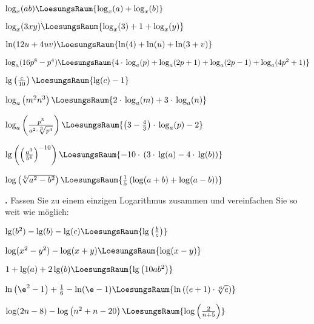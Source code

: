 \begin{bbwAufgabenBlock}
\item $\log_x(ab)  \LoesungsRaum{\log_x(a) + \log_x(b)}$
\item $\log_x(3xy)  \LoesungsRaum{\log_x(3) + 1 + \log_x(y)}$
\item $\ln(12u+4uv)  \LoesungsRaum{\ln(4) + \ln(u) + \ln(3+v)}$
\item $\log_a(16p^8-p^4) \LoesungsRaum{4\cdot{}\log_a(p)+ \log_a(2p+1) + \log_a(2p-1)+ \log_a(4p^2+1)}$
\seitenUmbruchImAufgabenteil{}
\item $\lg\left(\frac{c}{10}\right)  \LoesungsRaum{\lg(c) - 1}$
\item $\log_a\left( m^2n^3 \right)  \LoesungsRaum{2\cdot{}\log_a(m) + 3\cdot{}\log_a(n)}$
\item $\log_a\left( \frac{p^3}{a^2 \cdot{} \sqrt[3]{p^4}} \right)  \LoesungsRaum{\left(3-\frac43\right)\cdot{}\log_a(p)- 2}$
\item
$\lg\left(\left(\frac{a^3}{b^4}\right)^{-10}\right)  \LoesungsRaum{-10\cdot{}\left(3 \cdot{}\lg(a) - 4\cdot{} \lg(b)\right)}$
\noTRAINER{\newpage}

\item $\log \left( \sqrt[5]{a^2-b^2}\right)  \LoesungsRaum{\frac15\left(\log(a+b) + \log(a-b)\right)}$

\end{bbwAufgabenBlock}

\newpage


\textbf{\bbwAufgabenNummer{}.}
Fassen Sie zu einem einzigen Logarithmus zusammen und vereinfachen Sie
so weit wie möglich:

\begin{bbwAufgabenBlock}
\item $\lg(b^2) - \lg(b) - \lg(c) \LoesungsRaum{\lg\left(\frac{b}c\right)}$
\item $\log(x^2-y^2) - \log(x+y) \LoesungsRaum{\log(x-y)}$
\item $1+\lg(a)+2\lg(b)  \LoesungsRaum{\lg\left( 10ab^2 \right)}$
\item $\ln\left(\e^2-1\right) + \frac16 - \ln(\e-1) \LoesungsRaum{\ln\left((e+1)\cdot{}\sqrt[6]{e}\right)}$
\item $\log(2n-8) - \log\left(n^2+n-20\right) \LoesungsRaum{\log\left(\frac{2}{n+5}\right)}$

\end{bbwAufgabenBlock}



\platzFuerBerechnungenBisEndeSeite{}%
%
